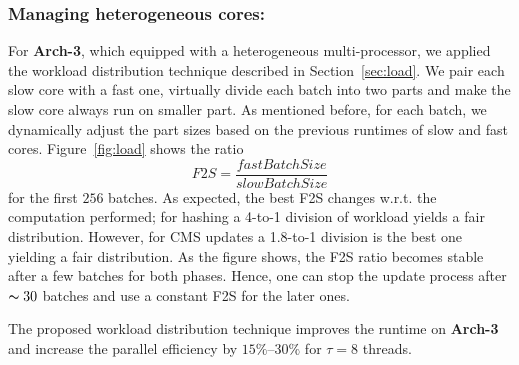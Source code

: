 \documentclass[10pt, review=true,sigconf]{acmart}
\begin{document}
\subsubsection{Managing heterogeneous cores:} For {\bf Arch-3}, which equipped with a heterogeneous multi-processor, we applied the workload distribution technique described in Section~\ref{sec:load}. We pair each slow core with a fast one, virtually divide each batch into two parts and make the slow core always run on smaller part. 
As mentioned before, for each batch, we dynamically adjust the part sizes based on the previous runtimes of slow and fast cores. Figure~\ref{fig:load} shows the ratio $$F2S = \frac{fastBatchSize}{slowBatchSize}$$ for the first $256$ batches. As expected, the best F2S changes w.r.t. the computation performed; for hashing a 4-to-1 division of workload yields a fair distribution. However, for CMS updates a 1.8-to-1 division is the best one yielding a fair distribution. As the figure shows, the F2S ratio becomes stable after a few batches for both phases. Hence, one can stop the update process after $\thicksim\xspace30$  batches and use a constant F2S for the later ones.

The proposed workload distribution technique improves the runtime on {\bf Arch-3} and increase the parallel efficiency by $15\%$--$30\%$ for $\tau = 8$ threads.   
\end{document}
